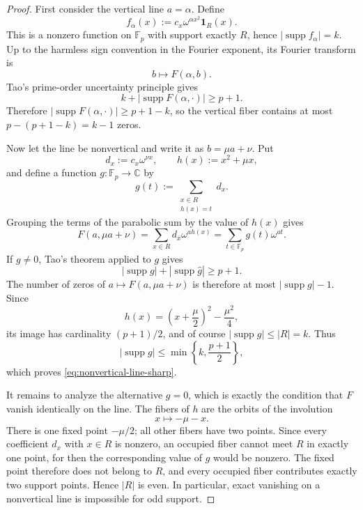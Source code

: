\documentclass[11pt]{article}
\newcommand{\F}{\mathbb F}
\newcommand{\C}{\mathbb C}
\newcommand{\supp}{\operatorname{supp}}
\begin{document}
\begin{proof}
First consider the vertical line \(a=\alpha\).  Define
\[
 f_\alpha(x):=c_x\omega^{\alpha x^2}\mathbf 1_R(x).
\]
This is a nonzero function on \(\F_p\) with support exactly \(R\), hence
\(|\supp f_\alpha|=k\).  Up to the harmless sign convention in the Fourier
exponent, its Fourier transform is
\[
 b\longmapsto F(\alpha,b).
\]
Tao's prime-order uncertainty principle gives
\[
 k+|\supp F(\alpha,\cdot)|\ge p+1.
\]
Therefore \(|\supp F(\alpha,\cdot)|\ge p+1-k\), so the vertical fiber
contains at most \(p-(p+1-k)=k-1\) zeros.

Now let the line be nonvertical and write it as \(b=\mu a+\nu\).  Put
\[
 d_x:=c_x\omega^{\nu x},
 \qquad
 h(x):=x^2+\mu x,
\]
and define a function \(g:\F_p\to\C\) by
\[
 g(t):=\sum_{\substack{x\in R\\ h(x)=t}}d_x.
\]
Grouping the terms of the parabolic sum by the value of \(h(x)\) gives
\[
 F(a,\mu a+\nu)
 =\sum_{x\in R}d_x\omega^{a h(x)}
 =\sum_{t\in\F_p}g(t)\omega^{at}.
\]
If \(g\ne0\), Tao's theorem applied to \(g\) gives
\[
 |\supp g|+|\supp \widehat g|\ge p+1.
\]
The number of zeros of \(a\mapsto F(a,\mu a+\nu)\) is therefore at most
\(|\supp g|-1\).  Since
\[
 h(x)=\left(x+\frac\mu2\right)^2-\frac{\mu^2}{4},
\]
its image has cardinality \((p+1)/2\), and of course
\(|\supp g|\le |R|=k\).  Thus
\[
 |\supp g|\le\min\left\{k,\frac{p+1}{2}\right\},
\]
which proves \eqref{eq:nonvertical-line-sharp}.

It remains to analyze the alternative \(g=0\), which is exactly the condition
that \(F\) vanish identically on the line.  The fibers of \(h\) are the
orbits of the involution
\[
 x\longmapsto-\mu-x.
\]
There is one fixed point \(-\mu/2\); all other fibers have two points.  Since
every coefficient \(d_x\) with \(x\in R\) is nonzero, an occupied fiber
cannot meet \(R\) in exactly one point, for then the corresponding value of
\(g\) would be nonzero.  The fixed point therefore does not belong to \(R\),
and every occupied fiber contributes exactly two support points.  Hence
\(|R|\) is even.  In particular, exact vanishing on a nonvertical line is
impossible for odd support.
\end{proof}
\end{document}
